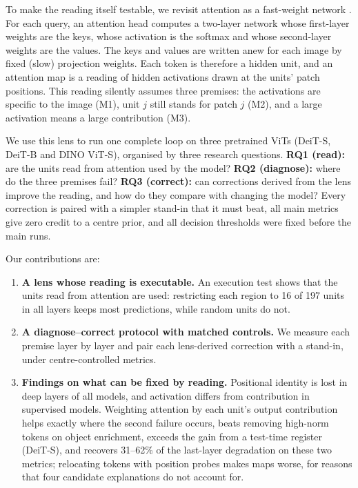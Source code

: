 \documentclass{article}
\begin{document}
To make the reading itself testable, we revisit attention as a fast-weight network \citep{schmidhuber1992,schlag2021}. For each query, an attention head computes a two-layer network whose first-layer weights are the keys, whose activation is the softmax and whose second-layer weights are the values. The keys and values are written anew for each image by fixed (slow) projection weights. Each token is therefore a hidden unit, and an attention map is a reading of hidden activations drawn at the units' patch positions. This reading silently assumes three premises: the activations are specific to the image (M1), unit $j$ still stands for patch $j$ (M2), and a large activation means a large contribution (M3).

We use this lens to run one complete loop on three pretrained ViTs (DeiT-S, DeiT-B and DINO ViT-S), organised by three research questions. \textbf{RQ1 (read):} are the units read from attention used by the model? \textbf{RQ2 (diagnose):} where do the three premises fail? \textbf{RQ3 (correct):} can corrections derived from the lens improve the reading, and how do they compare with changing the model? Every correction is paired with a simpler stand-in that it must beat, all main metrics give zero credit to a centre prior, and all decision thresholds were fixed before the main runs.

Our contributions are:

\begin{enumerate}
\item \textbf{A lens whose reading is executable.} An execution test shows that the units read from attention are used: restricting each region to 16 of 197 units in all layers keeps most predictions, while random units do not.
\item \textbf{A diagnose--correct protocol with matched controls.} We measure each premise layer by layer and pair each lens-derived correction with a stand-in, under centre-controlled metrics.
\item \textbf{Findings on what can be fixed by reading.} Positional identity is lost in deep layers of all models, and activation differs from contribution in supervised models. Weighting attention by each unit's output contribution helps exactly where the second failure occurs, beats removing high-norm tokens on object enrichment, exceeds the gain from a test-time register (DeiT-S), and recovers 31--62\% of the last-layer degradation on these two metrics; relocating tokens with position probes makes maps worse, for reasons that four candidate explanations do not account for.
\end{enumerate}
\end{document}

